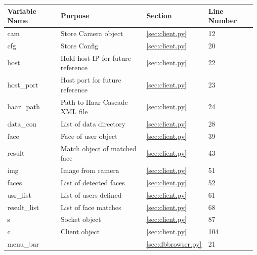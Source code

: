 \documentclass[a4paper]{article}
\begin{document}
\begin{table}[H]
    \begin{tabular}{|l|l|l|l|}
    \hline
    Variable Name & Purpose                                            & Section                   & Line Number \\ \hline
    cam           & Store Camera object                                & \ref{sec:client.py} & 12          \\ \hline
    cfg           & Store Config                                       & \ref{sec:client.py} & 20          \\ \hline
    host          & Hold host IP for future reference                  & \ref{sec:client.py} & 22          \\ \hline
    host\_port    & Host port for future reference                     & \ref{sec:client.py} & 23          \\ \hline
    haar\_path    & Path to Haar Cascade XML file                      & \ref{sec:client.py} & 24          \\ \hline
    data\_con     & List of data directory                             & \ref{sec:client.py} & 28          \\ \hline
    face          & Face of user object                                & \ref{sec:client.py} & 39          \\ \hline
    result        & Match object of matched face                       & \ref{sec:client.py} & 43          \\ \hline
    img           & Image from camera                                  & \ref{sec:client.py} & 51          \\ \hline
    faces         & List of detected faces                             & \ref{sec:client.py} & 52          \\ \hline
    usr\_list     & List of users defined                              & \ref{sec:client.py} & 61          \\ \hline
    result\_list  & List of face matches                               & \ref{sec:client.py} & 68          \\ \hline
    s             & Socket object                                      & \ref{sec:client.py} & 87          \\ \hline
    c             & Client object                                      & \ref{sec:client.py} & 104         \\ \hline
    menu\_bar     & ~                                                  & \ref{sec:dbbrowser.py} & 21          \\ \hline

\end{tabular}
\end{table}
\end{document}
